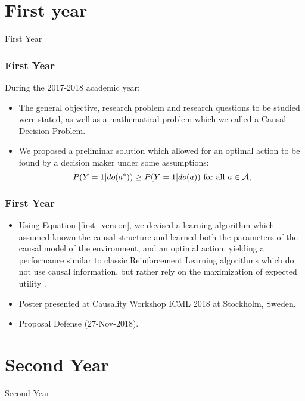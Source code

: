 \documentclass{beamer}
\theoremstyle{plain}
\begin{document}
\section{First year}
\begin{frame}
\begin{center}
\LARGE{First Year}
\end{center}
\end{frame}

\begin{frame}
\frametitle{First Year}
During the 2017-2018 academic year:
\begin{itemize}
\item The general objective, research problem and research questions to be studied were stated, as well as a mathematical problem which we called a Causal Decision Problem.
\item We proposed a preliminar solution which allowed for an optimal action to be found by a decision maker under some assumptions:
\begin{equation}{\label{first_version}}
P(Y=1 | do(a^\ast)) \geq P(Y=1 | do(a)) \textrm{ for all } a \in \mathcal{A},
\end{equation}
\end{itemize}
\end{frame}

\begin{frame}
\frametitle{First Year}
\begin{itemize}
\item Using Equation \ref{first_version}, we devised a learning algorithm which assumed known the causal structure and learned both the parameters of the causal model of the environment, and an optimal action, yielding a performance similar to classic Reinforcement Learning algorithms which do not use causal information, but rather rely on the maximization of expected utility \citep{gonzalez2018playing}.
\item Poster presented at Causality Workshop ICML 2018 at Stockholm, Sweden.
\item Proposal Defense (27-Nov-2018).
\end{itemize}
\end{frame}

\section{Second Year}
\begin{frame}
\begin{center}
\LARGE{Second Year}
\end{center}
\end{frame}
\end{document}
